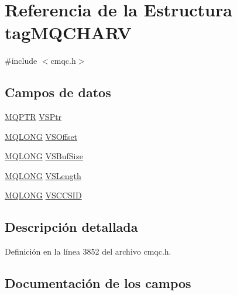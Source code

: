 \hypertarget{structtag_m_q_c_h_a_r_v}{}\section{Referencia de la Estructura tag\+M\+Q\+C\+H\+A\+R\+V}
\label{structtag_m_q_c_h_a_r_v}


{\ttfamily \#include $<$cmqc.\+h$>$}

\subsection*{Campos de datos}
\begin{DoxyCompactItemize}
\item 
\hyperlink{cmqc_8h_a0b835d8e479d7c42242ed9c6b6572f5a}{M\+Q\+P\+T\+R} \hyperlink{structtag_m_q_c_h_a_r_v_ae4adca62d509c0906d711f7c34e2b2f9}{V\+S\+Ptr}
\item 
\hyperlink{cmqc_8h_a1fb8d28cbda3fa8766a9821230cdb6d5}{M\+Q\+L\+O\+N\+G} \hyperlink{structtag_m_q_c_h_a_r_v_a2211c15f7346cc2cd5a153b70d55d051}{V\+S\+Offset}
\item 
\hyperlink{cmqc_8h_a1fb8d28cbda3fa8766a9821230cdb6d5}{M\+Q\+L\+O\+N\+G} \hyperlink{structtag_m_q_c_h_a_r_v_a0ecb35cb9ecf6eeab94b1c8b56160da5}{V\+S\+Buf\+Size}
\item 
\hyperlink{cmqc_8h_a1fb8d28cbda3fa8766a9821230cdb6d5}{M\+Q\+L\+O\+N\+G} \hyperlink{structtag_m_q_c_h_a_r_v_af59afd9bc843f5c5b554dfaad410233b}{V\+S\+Length}
\item 
\hyperlink{cmqc_8h_a1fb8d28cbda3fa8766a9821230cdb6d5}{M\+Q\+L\+O\+N\+G} \hyperlink{structtag_m_q_c_h_a_r_v_a48f906627aeadf5b2aaf1d4fc7cd03e0}{V\+S\+C\+C\+S\+I\+D}
\end{DoxyCompactItemize}


\subsection{Descripción detallada}


Definición en la línea 3852 del archivo cmqc.\+h.



\subsection{Documentación de los campos}
\hypertarget{structtag_m_q_c_h_a_r_v_a0ecb35cb9ecf6eeab94b1c8b56160da5}{}

